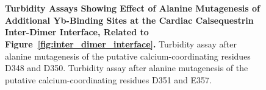 \begin{figure}[!ht]
\centering
{}
\hfill
\begin{fullpanelvar}
        \textbf{\figurepanela}\\
        
    \end{fullpanelvar}
    \hspace*{0.5cm}
    \begin{fullpanelvar}
        \textbf{\figurepanelb}\\
        
    \end{fullpanelvar}
    \hfill
    \rowspacersmall
    \caption[Turbidity assays showing effect of alanine mutagenesis of additional Yb-binding sites at the cardiac calsequestrin inter-dimer interface]{\textbf{Turbidity Assays Showing Effect of Alanine Mutagenesis of Additional Yb-Binding Sites at the Cardiac Calsequestrin Inter-Dimer Interface, Related to Figure~\ref{fig:inter_dimer_interface}.} \figurepanelcaptiona Turbidity assay after alanine mutagenesis of the putative calcium-coordinating residues D348 and D350. \figurepanelcaptionb Turbidity assay after alanine mutagenesis of the putative calcium-coordinating residues D351 and E357.}
    \label{fig:inter_dimer_interface_supplement}
\end{figure}



